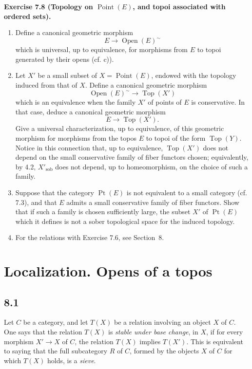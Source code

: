 \documentclass[11pt]{article}
\newcommand{\Top}{\operatorname{Top}}
\newcommand{\Ppoint}{\operatorname{Pt}}
\newcommand{\sob}{\operatorname{sob}}
\newenvironment{remarktext}[1]{\par\medskip\noindent\textbf{#1.}\ }{\par\medskip}
\providecommand{\Ouv}{\operatorname{Open}}
\providecommand{\Point}{\operatorname{Point}}
\begin{document}
\begin{remarktext}{Exercise 7.8 (Topology on \(\Point(E)\), and topoi associated with ordered sets)}
\begin{enumerate}[label=\alph*)]
\item Define a canonical geometric morphism
\[
E\longrightarrow\Ouv(E)^{\sim}
\]
which is universal, up to equivalence, for morphisms from \(E\) to topoi generated by their opens (cf. c)).

\item Let \(X'\) be a small subset of \(X=\Point(E)\), endowed with the topology induced from that of \(X\). Define a canonical geometric morphism
\[
\Ouv(E)^{\sim}\longrightarrow\Top(X')
\]
which is an equivalence when the family \(X'\) of points of \(E\) is conservative. In that case, deduce a canonical geometric morphism
\[
E\longrightarrow\Top(X').
\]
Give a universal characterization, up to equivalence, of this geometric morphism for morphisms from the topos \(E\) to topoi of the form \(\Top(Y)\). Notice in this connection that, up to equivalence, \(\Top(X')\) does not depend on the small conservative family of fiber functors chosen; equivalently, by 4.2, \(X'_{\sob}\) does not depend, up to homeomorphism, on the choice of such a family.

\item Suppose that the category \(\Ppoint(E)\) is not equivalent to a small category (cf. 7.3), and that \(E\) admits a small conservative family of fiber functors. Show that if such a family is chosen sufficiently large, the subset \(X'\) of \(\Ppoint(E)\) which it defines is not a sober topological space for the induced topology.

\item For the relations with Exercise 7.6, see Section~8.
\end{enumerate}
\end{remarktext}

\section{Localization. Opens of a topos}

\subsection*{8.1}
Let \(C\) be a category, and let \(T(X)\) be a relation involving an object \(X\) of \(C\). One says that the relation \(T(X)\) is \emph{stable under base change}, in \(X\), if for every morphism \(X'\to X\) of \(C\), the relation \(T(X)\) implies \(T(X')\). This is equivalent to saying that the full subcategory \(R\) of \(C\), formed by the objects \(X\) of \(C\) for which \(T(X)\) holds, is a \emph{sieve}.
\end{document}
